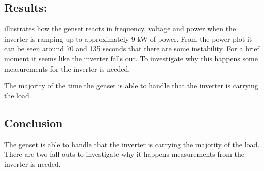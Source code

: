 \subsection*{Results:}
 illustrates how the genset reacts in frequency, voltage and power when the inverter is ramping up to approximately 9 kW of power. From the power plot it can be seen around 70 and 135 seconds that there are some instability. For a brief moment it seems like the inverter falls out. To investigate why this happens some measurements for the inverter is needed. 

The majority of the time the genset is able to handle that the inverter is carrying the load. 

\subsection*{Conclusion}
The genset is able to handle that the inverter is carrying the majority of the load. There are two fall outs to investigate why it happens measurements from the inverter is needed. 